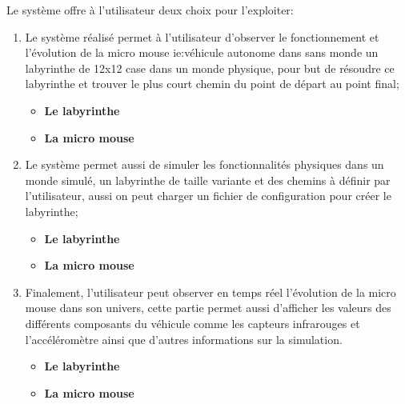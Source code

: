    Le système offre à l'utilisateur deux choix pour l'exploiter: \\
\begin{enumerate}

   \item Le système réalisé permet à l'utilisateur d'observer le fonctionnement
 et l'évolution de la micro mouse ie:véhicule autonome dans sans monde un 
 labyrinthe de 12x12 case dans un monde physique, pour but de résoudre ce 
 labyrinthe et trouver le plus court chemin du point de départ au point final; \\

\begin{itemize}
      \item \textbf{Le labyrinthe} \\

      \item \textbf{La micro mouse} \\
\end{itemize}

   \item Le système permet aussi de simuler les fonctionnalités physiques 
dans un monde simulé, un labyrinthe de taille variante et des chemins à 
définir par l'utilisateur, aussi on peut charger un fichier de configuration 
pour créer le labyrinthe; \\

\begin{itemize}
      \item \textbf{Le labyrinthe} \\

      \item \textbf{La micro mouse} \\
\end{itemize}

   \item Finalement, l'utilisateur peut observer en temps réel l'évolution 
de la micro mouse dans son univers, cette partie permet aussi d'afficher 
les valeurs des différents composants du véhicule comme les capteurs infrarouges 
et l'accéléromètre ainsi que d'autres informations sur la simulation. \\

\begin{itemize}
   \item \textbf{Le labyrinthe} \\

   \item \textbf{La micro mouse} \\
\end{itemize}

\end{enumerate}

